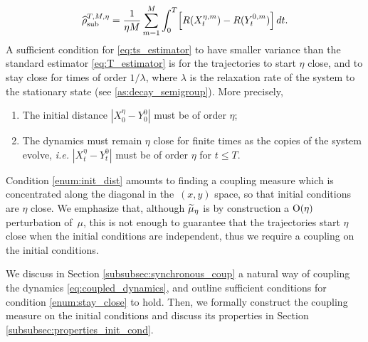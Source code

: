 %
\begin{equation}
    \TSest = \frac{1}{\eta M} \sum_{m=1}^M \int_0^T \bkt*{R(X_t^{\eta,m}) - R(Y_t^{0,m})} \, dt.
    \label{eq:ts_estimator}
\end{equation}
%
A sufficient condition for \eqref{eq:ts_estimator} to have smaller variance than the standard estimator \eqref{eq:T_estimator} is for the trajectories to start $\eta$ close, and to stay close for times of order $1/\lambda$, where $\lambda$ is the relaxation rate of the system to the stationary state (see \cref{as:decay_semigroup}). More precisely,
%

\begin{enumerate}[label={(\Alph*)}]
	\item \label{enum:init_dist} The initial distance $|X_0^\eta - Y_0^0|$ must be of order $\eta$;
	\item \label{enum:stay_close} The dynamics must remain $\eta$ close for finite times as the copies of the system evolve, \emph{i.e.} $|X_t^\eta - Y_t^0|$ must be of order $\eta$ for $t\leq T$.
\end{enumerate}
%
Condition \ref{enum:init_dist} amounts to finding a coupling measure which is concentrated along the diagonal in the~$(x,y)$ space, so that initial conditions are $\eta$ close. We emphasize that, although $\widetilde{\mu}_\eta$ is by construction a $\mathrm{O}(\eta)$ perturbation of~$\mu$, this is not enough to guarantee that the trajectories start $\eta$ close when the initial conditions are independent, thus we require a coupling on the initial conditions.

 We discuss in Section \ref{subsubsec:synchronous_coup} a natural way of coupling the dynamics \eqref{eq:coupled_dynamics}, and outline sufficient conditions for condition \ref{enum:stay_close} to hold. Then, we formally construct the coupling measure on the initial conditions and discuss its properties in Section \ref{subsubsec:properties_init_cond}.
 
